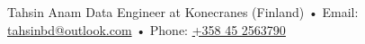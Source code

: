 

\begin{cvskills}

  \cvskill
    {Tahsin Anam} %
    {Data Engineer at Konecranes (Finland) • Email: \underline{tahsinbd@outlook.com} • Phone: \underline{+358 45 2563790} }%



\end{cvskills}
